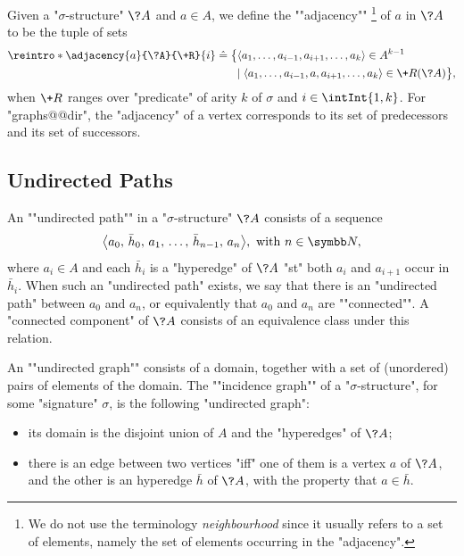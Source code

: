 Given a "$\sigma$-structure" $\?A$ and $a \in A$, we define the \AP""adjacency""%
\footnote{We do not use the terminology \emph{neighbourhood} since it usually refers
to a set of elements, namely the set of elements occurring in the "adjacency".}
of $a$ in $\?A$ to be the tuple of sets%
\AP{}
\begin{align*}
	\reintro*\adjacency{a}{\?A}{\+R}{i} & \defeq
		\big\{
			\langle a_1, \dotsc, a_{i-1}, a_{i+1}, \dotsc, a_k \rangle \in A^{k-1}
			\\ & \hphantom{\defeq \big\{ }\mid
			\langle a_1, \dotsc, a_{i-1}, a, a_{i+1}, \dotsc, a_k \rangle \in \+R(\?A)
		\big\},
\end{align*}
when $\+R$ ranges over "predicate" of arity $k$ of $\sigma$ and $i \in \intInt{1,k}$. 
For "graphs@@dir", the "adjacency" of a vertex corresponds to its set of predecessors and
its set of successors.

\subsection{Undirected Paths}

An \AP""undirected path"" in a "$\sigma$-structure" $\?A$ consists of a sequence
\[\big\langle a_0,\, \bar h_0,\, a_1,\, \dotsc,\, \bar h_{n-1},\, a_n\big\rangle, \text{ with } n \in \N,\]
where $a_i \in A$ and each $\bar h_i$ is a "hyperedge" of $\?A$ "st" both
$a_i$ and $a_{i+1}$ occur in $\bar h_i$. When such an "undirected path" exists, we say that
there is an "undirected path" between $a_0$ and $a_n$, or equivalently
that $a_0$ and $a_n$ are \AP""connected"".%
A \AP"connected component" of $\?A$ consists of an equivalence class under this relation.

An ""undirected graph"" consists of a domain, together with
a set of (unordered) pairs of elements of the domain.
The ""incidence graph"" of a "$\sigma$-structure",
for some "signature" $\sigma$, is the following "undirected graph":
\begin{itemize}
	\item its domain is the disjoint union of $A$
		and the "hyperedges" of $\?A$;
	\item there is an edge between two vertices "iff" one of them
		is a vertex $a$ of $\?A$, and the other is an hyperedge
		$\bar h$ of $\?A$, with the property that $a \in \bar h$.
\end{itemize}

